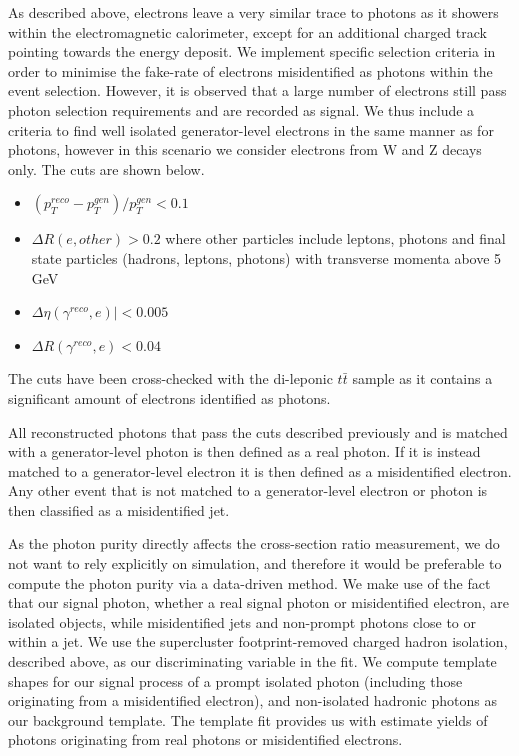 As described above, electrons leave a very similar trace to photons as it showers within the electromagnetic calorimeter, except for an additional charged track pointing towards the energy deposit. We implement specific selection criteria in order to minimise the fake-rate of electrons misidentified as photons within the event selection. However, it is observed that a large number of electrons still pass photon selection requirements and are recorded as signal. We thus include a criteria to find well isolated generator-level electrons in the same manner as for photons, however in this scenario we consider electrons from W and Z decays only. The cuts are shown below.

\begin{itemize}
	\item $\left( p_T^{reco} - p_T^{gen} \right) /p_T^{gen} < 0.1$
	\item $\Delta R ( e, other ) > 0.2$ where other particles include leptons, photons and final state
		  particles (hadrons, leptons, photons) with transverse momenta above 5 GeV
	\item $ \Delta\eta ( \gamma^{reco}, e )| < 0.005$
	\item $\Delta R ( \gamma^{reco}, e ) < 0.04$
\end{itemize}

The cuts have been cross-checked with the di-leponic $t\bar{t}$ sample as it contains a significant amount of electrons identified as photons.

All reconstructed photons that pass the cuts described previously and is matched with a generator-level photon is then defined as a real photon. If it is instead matched to a generator-level electron it is then defined as a misidentified electron. Any other event that is not matched to a generator-level electron or photon is then classified as a misidentified jet.

As the photon purity directly affects the cross-section ratio measurement, we do not want to rely explicitly on simulation, and therefore it would be preferable to compute the photon purity via a data-driven method. We make use of the fact that our signal photon, whether a real signal photon or misidentified electron, are isolated objects, while misidentified jets and non-prompt photons close to or within a jet. We use the supercluster footprint-removed charged hadron isolation, described above, as our discriminating variable in the fit. We compute template shapes for our signal process of a prompt isolated photon (including those originating from a misidentified electron), and non-isolated hadronic photons as our background template. The template fit provides us with estimate yields of photons originating from real photons or misidentified electrons.   

